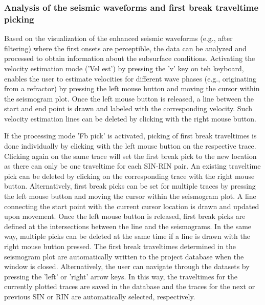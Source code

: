 \documentclass[a4paper,fleqn]{cas-sc}
\begin{document}
\subsubsection{Analysis of the seismic waveforms and first break traveltime picking}

Based on the visualization of the enhanced seismic waveforms (e.g., after filtering) where the first onsets are perceptible, the data can be analyzed and processed to obtain information about the subsurface conditions. Activating the velocity estimation mode ('Vel est') by pressing the 'v' key on teh keyboard, enables the user to estimate velocities for different wave phases (e.g., originating from a refractor) by pressing the left mouse button and moving the cursor within the seismogram plot. Once the left mouse button is released, a line between the start and end point is drawn and labeled with the corresponding velocity. Such velocity estimation lines can be deleted by clicking with the right mouse button.

If the processing mode 'Fb pick' is activated, picking of first break traveltimes is done individually by clicking with the left mouse button on the respective trace. Clicking again on the same trace will set the first break pick to the new location as there can only be one traveltime for each SIN-RIN pair. An existing traveltime pick can be deleted by clicking on the corresponding trace with the right mouse button. Alternatively, first break picks can be set for multiple traces by pressing the left mouse button and moving the cursor within the seismogram plot. A line connecting the start point with the current cursor location is drawn and updated upon movement. Once the left mouse button is released, first break picks are defined at the intersections between the line and the seismograms. In the same way, multiple picks can be deleted at the same time if a line is drawn with the right mouse button pressed. The first break traveltimes determined in the seismogram plot are automatically written to the project database when the window is closed. Alternatively, the user can navigate through the datasets by pressing the 'left' or 'right' arrow keys. In this way, the traveltimes for the currently plotted traces are saved in the database and the traces for the next or previous SIN or RIN are automatically selected, respectively.  
\end{document}
